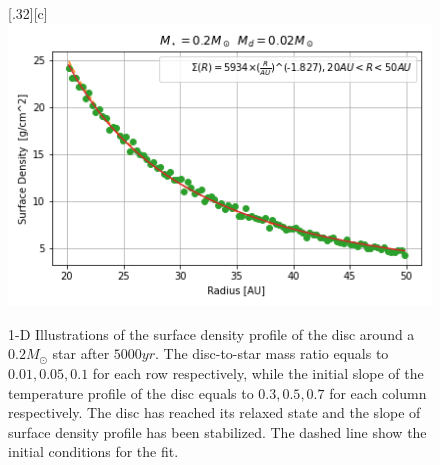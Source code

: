 \documentclass[aps,prb,twocolumn,superscriptaddress,floatfix,longbibliography]{revtex4-2}
\begin{document}
\begin{appendices}
\begin{figure}[!htbp]
  \subcaptionbox*{}[.32\linewidth][c]{%
    \includegraphics[width=\linewidth]{Graphs_1D/r_0.2s_0.02d_0.7q_1D.png}}\quad
  \caption{1-D Illustrations of the surface density profile of the disc around a $0.2 M_{\odot}$ star after $5000yr$. The disc-to-star mass ratio equals to $0.01, 0.05, 0.1$ for each row respectively, while the initial slope of the temperature profile of the disc equals to $0.3, 0.5, 0.7$ for each column respectively. The disc has reached its relaxed state and the slope of surface density profile has been stabilized. The dashed line show the initial conditions for the fit.}
\end{figure}


\end{appendices}
\end{document}
